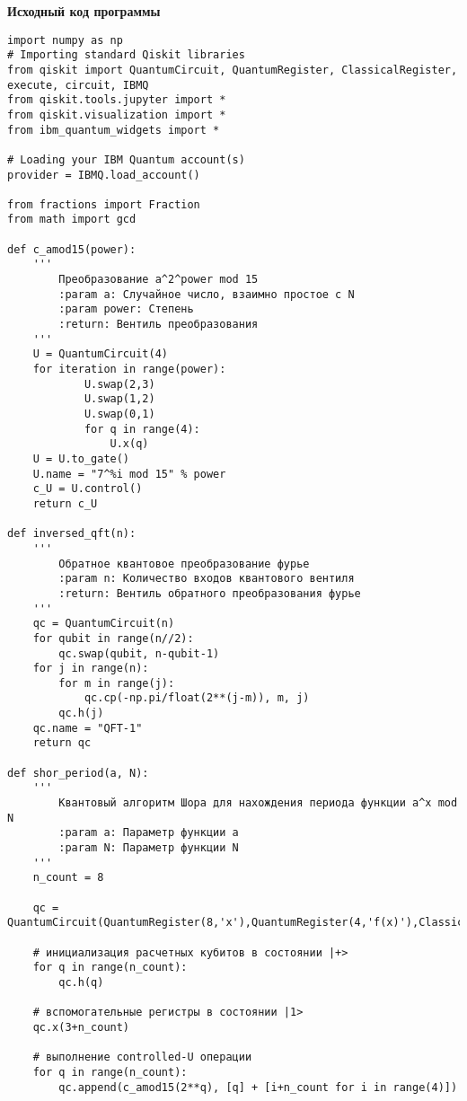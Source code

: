 
\begin{center}
\textbf{Исходный код программы}
\end{center}

\begin{verbatim}
import numpy as np
# Importing standard Qiskit libraries
from qiskit import QuantumCircuit, QuantumRegister, ClassicalRegister, execute, circuit, IBMQ
from qiskit.tools.jupyter import *
from qiskit.visualization import *
from ibm_quantum_widgets import *

# Loading your IBM Quantum account(s)
provider = IBMQ.load_account()

from fractions import Fraction
from math import gcd

def c_amod15(power):
    '''
        Преобразование a^2^power mod 15
        :param a: Случайное число, взаимно простое с N
        :param power: Степень
        :return: Вентиль преобразования
    '''
    U = QuantumCircuit(4)
    for iteration in range(power):
            U.swap(2,3)
            U.swap(1,2)
            U.swap(0,1)
            for q in range(4):
                U.x(q)
    U = U.to_gate()
    U.name = "7^%i mod 15" % power
    c_U = U.control()
    return c_U

def inversed_qft(n):
    '''
        Обратное квантовое преобразование фурье
        :param n: Количество входов квантового вентиля
        :return: Вентиль обратного преобразования фурье
    '''
    qc = QuantumCircuit(n)
    for qubit in range(n//2):
        qc.swap(qubit, n-qubit-1)
    for j in range(n):
        for m in range(j):
            qc.cp(-np.pi/float(2**(j-m)), m, j)
        qc.h(j)
    qc.name = "QFT-1"
    return qc

def shor_period(a, N):
    '''
        Квантовый алгоритм Шора для нахождения периода функции a^x mod N
        :param a: Параметр функции a
        :param N: Параметр функции N
    '''
    n_count = 8

    qc = QuantumCircuit(QuantumRegister(8,'x'),QuantumRegister(4,'f(x)'),ClassicalRegister(8))

    # инициализация расчетных кубитов в состоянии |+>
    for q in range(n_count):
        qc.h(q)

    # вспомогательные регистры в состоянии |1>
    qc.x(3+n_count)

    # выполнение controlled-U операции
    for q in range(n_count):
        qc.append(c_amod15(2**q), [q] + [i+n_count for i in range(4)])


\end{verbatim}
